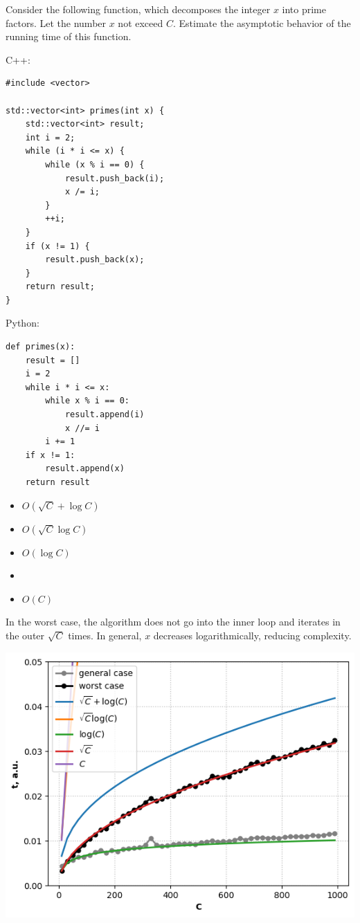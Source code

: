 \documentclass[a4paper]{article}
\begin{document}
Consider the following function, which decomposes the integer $x$ into prime factors. Let the number $x$ not exceed $C$. Estimate the asymptotic behavior of the running time of this function.

\SPACE

\noindent C++:

\begin{lstlisting}[style=C++]
#include <vector>

std::vector<int> primes(int x) {
    std::vector<int> result;
    int i = 2;
    while (i * i <= x) {
        while (x % i == 0) {
            result.push_back(i);
            x /= i;
        }
        ++i;
    }
    if (x != 1) {
        result.push_back(x);
    }
    return result;
}
\end{lstlisting}

\SPACE

\noindent Python:

\begin{lstlisting}[style=Python]
def primes(x):
    result = []
    i = 2
    while i * i <= x:
        while x % i == 0:
            result.append(i)
            x //= i
        i += 1
    if x != 1:
        result.append(x)
    return result
\end{lstlisting}

\SPACE

\LINE

\SPACE

\begin{itemize}
\item $O(\sqrt{C} + \log C)$
\item $O(\sqrt{C} \log C)$
\item $O(\log C)$
\item {}
\item $O(C)$
\end{itemize}

\SPACE

\newpage

In the worst case, the algorithm does not go into the inner loop and iterates in the outer $\sqrt{C}$ times. In general, $x$ decreases logarithmically, reducing complexity.

\begin{center}
\includegraphics[width=15cm]{6.png}
\end{center}
\end{document}
